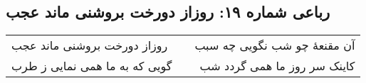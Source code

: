 \begin{center}
\section*{رباعی شماره ۱۹: روزاز دورخت بروشنی ماند عجب}
\label{sec:sh019}
\begin{longtable}{l p{0.5cm} r}
روزاز دورخت بروشنی ماند عجب
&&
آن مقنعهٔ چو شب نگویی چه سبب
\\
گویی که به ما همی نمایی ز طرب
&&
کاینک سر روز ما همی گردد شب
\\
\end{longtable}
\end{center}
